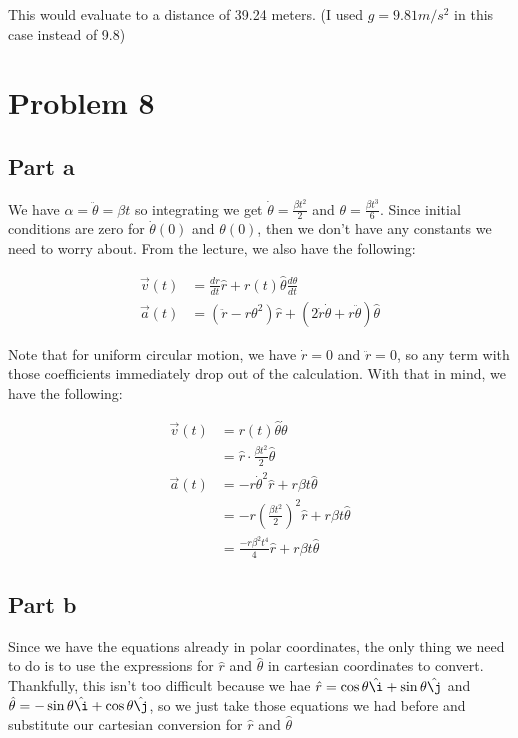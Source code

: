 \documentclass{article}
\theoremstyle{definition}
\numberwithin{equation}{section}
\numberwithin{definition}{section}
\begin{document}
This would evaluate to a distance of 39.24 meters. (I used $g = 9.81 m/s^2$ in this case instead of 9.8)


\section{Problem 8}
\subsection{Part a}
We have $\alpha  = \ddot \theta =  \beta t$ so integrating we get $\dot \theta = \frac{\beta t^2}{2}$ and $\theta = \frac{\beta t^3}{6}$. Since initial conditions are zero for $\dot \theta(0)$ and $\theta(0)$, then we don't have any constants we need to worry about. From the lecture, we also have the following: 

\begin{align*}
	\vec v(t) &= \frac{dr}{dt} \hat r + r(t) \hat \theta \frac{d\theta}{dt}\\
	\vec a(t) &= (\ddot r - r\theta^2)\hat r + (2\dot r \dot \theta + r \ddot \theta)\hat \theta
\end{align*}

Note that for uniform circular motion, we have $\dot r = 0$ and $\ddot r = 0$, so any term with those coefficients immediately drop out of the calculation. With that in mind, we have the following: 

\begin{align*}
	\vec v(t) &= r(t) \hat \theta \dot \theta \\
	&= \boxed{\hat r \cdot \frac{\beta t^2}{2}\hat \theta}\\
	\vec a(t) &= -r\dot\theta^2 \hat r + r\beta t \hat \theta\\
	&= -r\left(\frac{\beta t^2}{2}\right)^2 \hat r + r\beta t\hat \theta\\
	&= \boxed{\frac{-r\beta^2t^4}{4}\hat r + r\beta t \hat \theta}
\end{align*}


\subsection{Part b}
Since we have the equations already in polar coordinates, the only thing we need to do is to use the expressions for $\hat r$ and $\hat \theta$ in cartesian coordinates to convert. Thankfully, this isn't too difficult because we hae $\hat r = \cos \theta \hat \i + \sin\theta \hat \j$ and $\hat \theta = -\sin \theta \hat \i + \cos \theta \hat \j$, so we just take those equations we had before and substitute our cartesian conversion for $\hat r$ and $\hat \theta$
\end{document}
